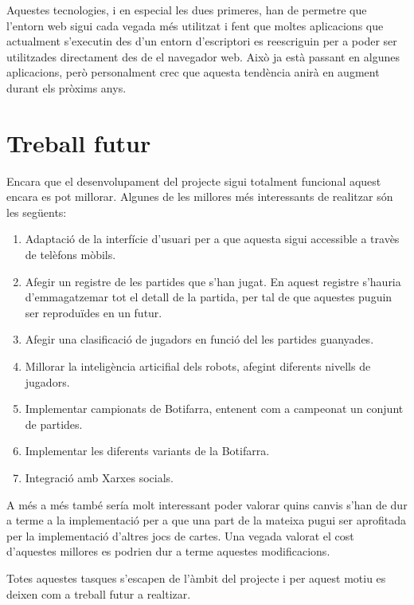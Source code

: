 Aquestes tecnologies, i en especial les dues primeres, han de permetre que l'entorn web sigui cada vegada més utilitzat i fent que moltes aplicacions que actualment s'executin des d'un entorn d'escriptori es reescriguin per a poder ser utilitzades directament des de el navegador web. Això ja està passant en algunes aplicacions, però personalment crec que aquesta tendència anirà en augment durant els pròxims anys. 

\section{Treball futur}

Encara que el desenvolupament del projecte sigui totalment funcional aquest encara es pot millorar. Algunes de les millores més interessants de realitzar són les següents: 

\begin{enumerate}
    \item{Adaptació de la interfície d'usuari per a que aquesta sigui accessible a travès de telèfons mòbils.}
    \item{Afegir un registre de les partides que s'han jugat. En aquest registre s'hauria d'emmagatzemar tot el detall de la partida, per tal de que aquestes puguin ser reproduïdes en un futur.}
    \item{Afegir una clasificació de jugadors en funció del les partides guanyades.}
    \item{Millorar la inteligència articifial dels robots, afegint diferents nivells de jugadors.}
    \item{Implementar campionats de Botifarra, entenent com a campeonat un conjunt de partides.}
    \item{Implementar les diferents variants de la Botifarra.}
    \item{Integració amb Xarxes socials.}
\end{enumerate}

A més a més també sería molt interessant poder valorar quins canvis s'han de dur a terme a la implementació per a que una part de la mateixa pugui ser aprofitada per la implementació d'altres jocs de cartes. Una vegada valorat el cost d'aquestes millores es podrien dur a terme aquestes modificacions.

Totes aquestes tasques s'escapen de l'àmbit del projecte i per aquest motiu es deixen com a treball futur a realtizar.
